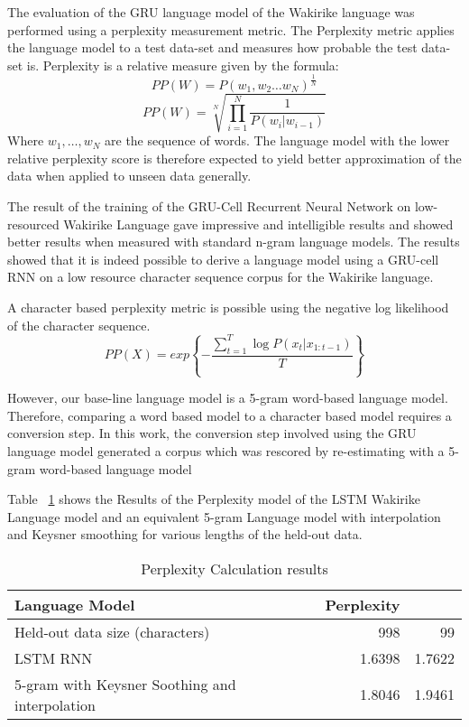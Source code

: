 The evaluation of the GRU language model of the Wakirike language was performed using a perplexity measurement metric. The Perplexity metric applies the language model to a test data-set and measures how probable the test data-set is. Perplexity is a relative measure given by the formula:
%
\begin{equation}
PP(W)=P(w_1,w_2\dots w_N)^\frac{1}{N}
\label{ch5_eq1_ppx}
\end{equation}
%
%
\begin{equation}
PP(W)=\sqrt[N]{\prod_{i=1}^N\frac{1}{P(w_i|w_{i-1})}}
\label{ch5_eq2_ppx}
\end{equation}
%
Where $w_1,\dots,w_N$ are the sequence of words. The language model with the lower relative perplexity score is therefore expected to yield better approximation of the data when applied to unseen data generally.

The result of the training of the GRU-Cell Recurrent Neural Network on low-resourced Wakirike Language gave impressive and intelligible results and showed better results when measured with standard n-gram language models. The results showed that it is indeed possible to derive a language model using a GRU-cell RNN on a low resource character sequence corpus for the Wakirike language.

A character based perplexity metric is possible using  the negative log likelihood of the character sequence.
\begin{equation}
    PP(X)=exp\left\{−\frac{\sum_{t=1}^T\log P(x_t|x_{1:t−1})}{T}\right\}
\label{ch5_eq3_ppx}
\end{equation}

However, our base-line language model is a 5-gram word-based language model.  Therefore, comparing a word based model to a character based model requires a conversion step. In this work, the conversion step involved using the GRU language model generated a corpus which was rescored by re-estimating with a 5-gram word-based language model

Table ~\ref{tab:example} shows the Results of the Perplexity model of the LSTM Wakirike Language model and an equivalent 5-gram Language model with interpolation and Keysner smoothing \citep{Heafield-estimate} for various lengths of the held-out data.


\begin{table}
  \caption{Perplexity Calculation results}
  \label{tab:example}
\begin{tabular}{lrr}
\toprule
Language Model & Perplexity  \\
\midrule
Held-out data size (characters) & 998 & 99\\
\midrule
LSTM RNN & 1.6398 & 1.7622\\
5-gram with Keysner Soothing and interpolation & 1.8046 & 1.9461\\
\bottomrule
\end{tabular}
\end{table}
